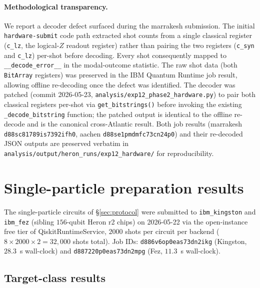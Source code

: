 \documentclass[11pt]{article}
\begin{document}
\paragraph{Methodological transparency.}  We report a decoder defect surfaced during the marrakesh submission.  The initial \texttt{hardware-submit} code path extracted shot counts from a single classical register (\texttt{c\_lz}, the logical-$Z$ readout register) rather than pairing the two registers (\texttt{c\_syn} and \texttt{c\_lz}) per-shot before decoding.  Every shot consequently mapped to \texttt{\_\_decode\_error\_\_} in the modal-outcome statistic.  The raw shot data (both \texttt{BitArray} registers) was preserved in the IBM Quantum Runtime job result, allowing offline re-decoding once the defect was identified.  The decoder was patched (commit 2026-05-23, \texttt{analysis/exp12\_phase2\_hardware.py}) to pair both classical registers per-shot via \texttt{get\_bitstrings()} before invoking the existing \texttt{\_decode\_bitstring} function; the patched output is identical to the offline re-decode and is the canonical cross-Atlantic result.  Both job results (marrakesh \texttt{d88sc81789is7392ifh0}, aachen \texttt{d88se1pmdmfc73cn24p0}) and their re-decoded JSON outputs are preserved verbatim in \texttt{analysis/output/heron\_runs/exp12\_hardware/} for reproducibility.

\section{Single-particle preparation results}
\label{sec:phase2-results}

The single-particle circuits of \S\ref{sec:protocol} were submitted to \texttt{ibm\_kingston} and \texttt{ibm\_fez} (sibling $156$-qubit Heron r2 chips) on 2026-05-22 via the open-instance free tier of QiskitRuntimeService, $2000$ shots per circuit per backend ($8 \times 2000 \times 2 = 32{,}000$ shots total).  Job IDs: \texttt{d886v6op0eas73dn2ikg} (Kingston, $28.3$~s wall-clock) and \texttt{d887220p0eas73dn2mpg} (Fez, $11.3$~s wall-clock).

\subsection{Target-class results}
\label{sec:target-results}
\end{document}
